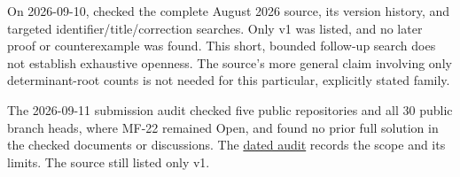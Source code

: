 \documentclass[11pt,a4paper]{article}
\begin{document}
On 2026-09-10, checked the complete August 2026 source, its version
history, and targeted identifier/title/correction searches. Only v1 was
listed, and no later proof or counterexample was found. This short,
bounded follow-up search does not establish exhaustive openness. The
source's more general claim involving only determinant-root counts is
not needed for this particular, explicitly stated family.

The 2026-09-11 submission audit checked five public repositories and all
30 public branch heads, where MF-22 remained Open, and found no prior
full solution in the checked documents or discussions. The
\href{https://github.com/ajt60gaibb/OpenProblemsInNLA/blob/main/references/stepaniants-mf22-2026-09-11/verification/network-check.json}{dated
audit} records the scope and its limits. The source still listed only
v1.
\end{document}

